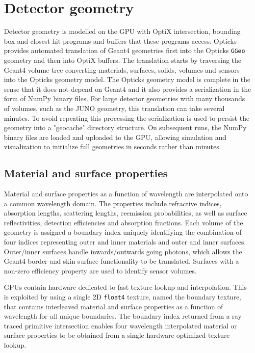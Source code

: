 \documentclass{webofc}
\begin{document}
\section{Detector geometry} 
%
%
Detector geometry is modelled on the GPU with OptiX intersection, bounding box 
and closest hit programs and buffers that these programs access.
Opticks provides automated translation of Geant4 geometries first into the Opticks {\tt GGeo} geometry and then into OptiX buffers.
The translation starts 
by traversing the Geant4 volume tree converting materials, surfaces, solids, volumes and sensors 
into the Opticks geometry model.  The Opticks geometry model is complete 
in the sense that it does not depend on Geant4 and it also provides a serialization in the 
form of NumPy\cite{numpy} binary files. 
%
For large detector geometries with many thousands of volumes, such as the JUNO geometry, 
this translation can take several minutes. To avoid repeating this processing the serialization 
is used to persist the geometry into a "geocache" directory structure.
On subsequent runs, the NumPy binary files are loaded and uploaded to the GPU, allowing simulation and 
visualization to initialize full geometries in seconds rather than minutes.
%
\subsection{Material and surface properties} 
%
Material and surface properties as a function of wavelength are interpolated onto a common wavelength domain.
The properties include refractive indices, absorption lengths, scattering lengths, reemission probabilities, 
as well as surface reflectivities, detection efficiencies and absorption fractions. 
Each volume of the geometry is assigned a boundary index uniquely identifying the combination of four indices representing 
outer and inner materials and outer and inner surfaces. Outer/inner surfaces handle inwards/outwards going photons, which allows the Geant4 border and skin
surface functionality to be translated. Surfaces with a non-zero efficiency property are used to identify sensor volumes. 

GPUs contain hardware dedicated to fast texture lookup and interpolation.
This is exploited by using a single 2D {\tt float4} texture, named the boundary texture,
that contains interleaved material and surface properties as a function of wavelength for all
unique boundaries.
The boundary index returned from a ray traced primitive intersection
enables four wavelength interpolated material or surface properties to be
obtained from a single hardware optimized texture lookup.
%
\end{document}
